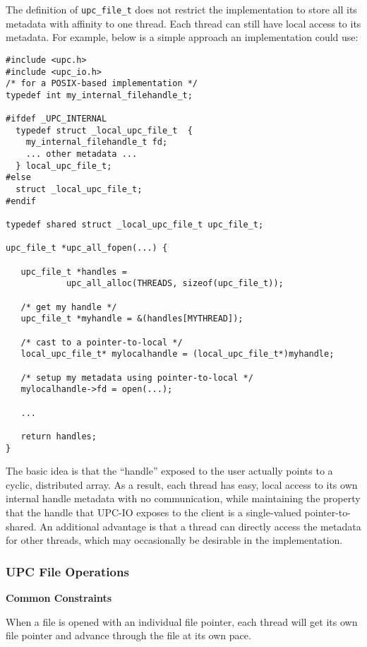 \np The definition of {\tt upc\_file\_t} does not restrict the implementation to
store all its metadata with affinity to one thread. Each thread can still
have local access to its metadata. For example, below is a simple approach
an implementation could use:

\begin{verbatim}
#include <upc.h>
#include <upc_io.h>
/* for a POSIX-based implementation */
typedef int my_internal_filehandle_t; 

#ifdef _UPC_INTERNAL
  typedef struct _local_upc_file_t  {
    my_internal_filehandle_t fd;
    ... other metadata ...
  } local_upc_file_t;
#else
  struct _local_upc_file_t;
#endif

typedef shared struct _local_upc_file_t upc_file_t;

upc_file_t *upc_all_fopen(...) {

   upc_file_t *handles = 
            upc_all_alloc(THREADS, sizeof(upc_file_t));

   /* get my handle */
   upc_file_t *myhandle = &(handles[MYTHREAD]); 
   
   /* cast to a pointer-to-local */
   local_upc_file_t* mylocalhandle = (local_upc_file_t*)myhandle;

   /* setup my metadata using pointer-to-local */
   mylocalhandle->fd = open(...);

   ...

   return handles;
}
\end{verbatim}

\np The basic idea is that the ``handle'' exposed to the user actually points to
a cyclic, distributed array. As a result, each thread has easy, local access
to its own internal handle metadata with no communication, while maintaining
the property that the handle that UPC-IO exposes to the client is a
single-valued pointer-to-shared. An additional advantage is that a thread
can directly access the metadata for other threads, which may occasionally
be desirable in the implementation.

\subsubsection{UPC File Operations}

{\bf Common Constraints}
\label{upc-io-common}

\npf When a file is opened with an individual file pointer, each thread will get
its own file pointer and advance through the file at its own pace.


